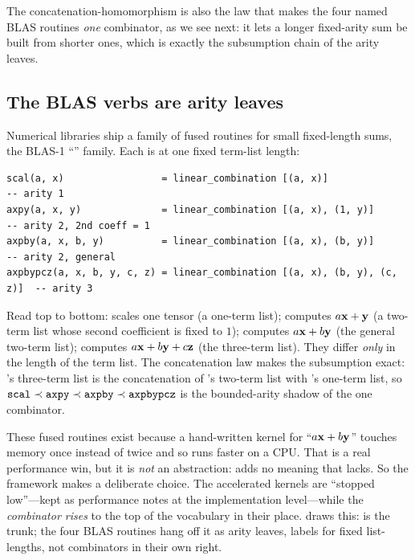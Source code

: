 The concatenation-homomorphism is also the law that makes the four named BLAS
routines \emph{one} combinator, as we see next: it lets a longer fixed-arity sum be
built from shorter ones, which is exactly the subsumption chain of the arity leaves.

\subsection{The BLAS verbs are arity leaves}

Numerical libraries ship a family of fused routines for small fixed-length sums,
the BLAS-1 ``'' family. Each is  at one fixed
term-list length:
\begin{lstlisting}[style=l4style]
scal(a, x)                 = linear_combination [(a, x)]                  -- arity 1
axpy(a, x, y)              = linear_combination [(a, x), (1, y)]          -- arity 2, 2nd coeff = 1
axpby(a, x, b, y)          = linear_combination [(a, x), (b, y)]          -- arity 2, general
axpbypcz(a, x, b, y, c, z) = linear_combination [(a, x), (b, y), (c, z)]  -- arity 3
\end{lstlisting}
Read top to bottom:  scales one tensor (a one-term list); 
computes $a\mathbf{x} + \mathbf{y}$ (a two-term list whose second coefficient is fixed to $1$);
 computes $a\mathbf{x} + b\mathbf{y}$ (the general two-term list); 
computes $a\mathbf{x} + b\mathbf{y} + c\mathbf{z}$ (the three-term list). They differ \emph{only} in the
length of the term list. The concatenation law makes the subsumption exact:
's three-term list is the concatenation of 's two-term
list with 's one-term list, so $\texttt{scal} \prec \texttt{axpy} \prec
\texttt{axpby} \prec \texttt{axpbypcz}$ is the bounded-arity shadow of the one
combinator.

These fused routines exist because a hand-written kernel for ``$a\mathbf{x} + b\mathbf{y}$''
touches memory once instead of twice and so runs faster on a CPU. That is a real
performance win, but it is \emph{not} an abstraction:  adds no meaning
that  lacks. So the framework makes a deliberate choice.
The accelerated kernels are ``stopped low''---kept as performance notes at the
implementation level---while the \emph{combinator rises} to the top of the
vocabulary in their place.  draws this: 
is the trunk; the four BLAS routines hang off it as arity leaves, labels for fixed
list-lengths, not combinators in their own right.

